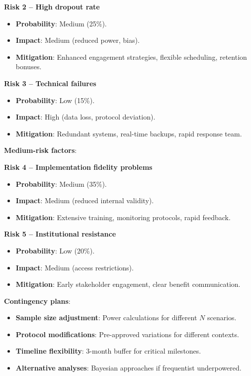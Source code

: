\textbf{Risk 2 -- High dropout rate}
\begin{itemize}
	\item \textbf{Probability}: Medium (25\%).
	\item \textbf{Impact}: Medium (reduced power, bias).
	\item \textbf{Mitigation}: Enhanced engagement strategies, flexible scheduling, retention bonuses.
\end{itemize}

\textbf{Risk 3 -- Technical failures}
\begin{itemize}
	\item \textbf{Probability}: Low (15\%).
	\item \textbf{Impact}: High (data loss, protocol deviation).
	\item \textbf{Mitigation}: Redundant systems, real-time backups, rapid response team.
\end{itemize}

\textbf{Medium-risk factors}:

\textbf{Risk 4 -- Implementation fidelity problems}
\begin{itemize}
	\item \textbf{Probability}: Medium (35\%).
	\item \textbf{Impact}: Medium (reduced internal validity).
	\item \textbf{Mitigation}: Extensive training, monitoring protocols, rapid feedback.
\end{itemize}

\textbf{Risk 5 -- Institutional resistance}
\begin{itemize}
	\item \textbf{Probability}: Low (20\%).
	\item \textbf{Impact}: Medium (access restrictions).
	\item \textbf{Mitigation}: Early stakeholder engagement, clear benefit communication.
\end{itemize}

\textbf{Contingency plans}:
\begin{itemize}
	\item \textbf{Sample size adjustment}: Power calculations for different $N$ scenarios.
	\item \textbf{Protocol modifications}: Pre-approved variations for different contexts.
	\item \textbf{Timeline flexibility}: 3-month buffer for critical milestones.
	\item \textbf{Alternative analyses}: Bayesian approaches if frequentist underpowered.
\end{itemize}

